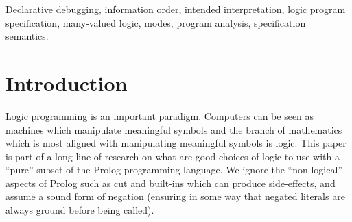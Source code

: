 \documentclass{tlp}
\begin{document}
\begin{keywords}
Declarative debugging,
information order,
intended interpretation,
logic program specification,
many-valued logic,
modes,
program analysis,
specification semantics.
\end{keywords}

\section{Introduction}

Logic programming is an important paradigm.  Computers can be seen as
machines which manipulate meaningful symbols and the branch of mathematics
which is most aligned with manipulating meaningful symbols is logic.
This paper is part of a long line of research on what are good choices of
logic to use with a ``pure'' subset of the Prolog programming language.
We ignore the ``non-logical'' aspects of Prolog such as cut and built-ins
which can produce side-effects, and assume a sound form of negation
(ensuring in some way that negated literals are always ground before
being called).
\end{document}

